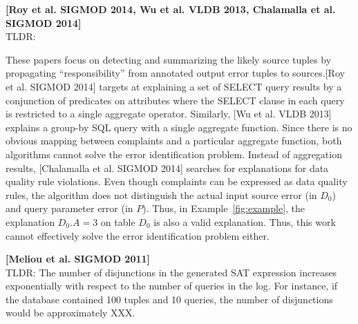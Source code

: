 \documentclass{vldb}
\newcounter{prob}
\begin{document}
\noindent \textbf{[Roy et al. SIGMOD 2014, Wu et al. VLDB 2013, Chalamalla et al. SIGMOD 2014]} \\
TLDR: 


These papers focus on detecting and summarizing the likely source tuples by propagating ``responsibility'' from annotated output error tuples to sources.[Roy et al. SIGMOD 2014] targets at explaining a set of SELECT query results by a conjunction of predicates on attributes where the SELECT clause in each query is restricted to a single aggregate operator. 
Similarly, [Wu et al. VLDB 2013] explains a group-by SQL query with a single aggregate function. Since there is no obvious mapping between complaints and a particular aggregate function, both algorithms cannot solve the error identification problem. Instead of aggregation results, [Chalamalla et al. SIGMOD 2014] searches for explanations for data quality rule violations. Even though complaints can be expressed as data quality rules, the algorithm does not distinguish the actual input source error (in $D_0$) and query parameter error (in $P$). Thus, in Example~\ref{fig:example}, the explanation $D_0.A = 3$ on table $D_0$ is also a valid explanation. Thus, this work cannot effectively solve the error identification problem either.

\noindent \textbf{[Meliou et al. SIGMOD 2011]} \\
TLDR: The number of disjunctions in the generated SAT expression increases exponentially with respect to the number of queries in the log.  For instance, if the database contained 100 tuples and 10 queries, the number of disjunctions would be approximately XXX.
\end{document}
